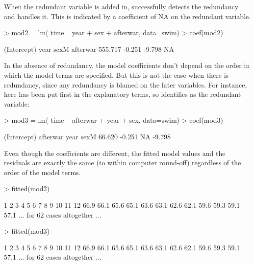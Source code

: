When the redundant variable is added in,  successfully
detects the redundancy and handles it.  This is indicated by a
coefficient of NA on the redundant variable.
\begin{Schunk}
\begin{Sinput}
> mod2 = lm( time ~ year + sex + afterwar, data=swim)
> coef(mod2)
\end{Sinput}
\begin{Soutput}
(Intercept)        year        sexM    afterwar 
    555.717      -0.251      -9.798          NA 
\end{Soutput}
\end{Schunk}

In the absence of redundancy, the model coefficients don't depend on
the order in which the model terms are specified.  But this is not the
case when there is redundancy, since any redundancy is blamed on the
later variables.  For instance, here  has been put first
in the explanatory terms, so  identifies  as the
redundant variable:
\begin{Schunk}
\begin{Sinput}
> mod3 = lm( time ~ afterwar + year + sex, data=swim)
> coef(mod3)
\end{Sinput}
\begin{Soutput}
(Intercept)    afterwar        year        sexM 
     66.620      -0.251          NA      -9.798 
\end{Soutput}
\end{Schunk}

Even though the coefficients are different, the fitted model values
and the residuals are exactly the same (to within computer round-off)
regardless of the order of the
model terms.
\begin{Schunk}
\begin{Sinput}
> fitted(mod2)
\end{Sinput}
\end{Schunk}
\begin{Schunk}
\begin{Soutput}
   1    2    3    4    5    6    7    8    9   10   11   12 
66.9 66.1 65.6 65.1 63.6 63.1 62.6 62.1 59.6 59.3 59.1 57.1 
... for 62 cases altogether ...
\end{Soutput}
\end{Schunk}
\begin{Schunk}
\begin{Sinput}
> fitted(mod3)
\end{Sinput}
\end{Schunk}
\begin{Schunk}
\begin{Soutput}
   1    2    3    4    5    6    7    8    9   10   11   12 
66.9 66.1 65.6 65.1 63.6 63.1 62.6 62.1 59.6 59.3 59.1 57.1 
... for 62 cases altogether ...
\end{Soutput}
\end{Schunk}

